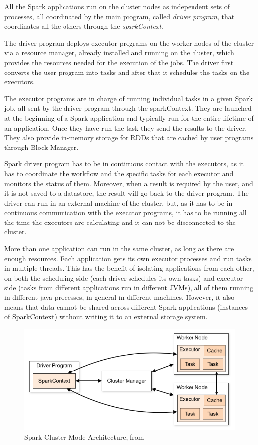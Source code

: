 \documentclass[11pt]{book} %
\begin{document}
      All the Spark applications run on the cluster nodes as independent sets of processes, all coordinated by the main program, called \emph{driver program}, that coordinates all the others through the \emph{sparkContext}.

      The driver program deploys executor programs on the worker nodes of the cluster via a resource manager, already installed and running on the cluster, which provides the resources needed for the execution of the jobs. The driver first converts the user program into tasks and after that it schedules the tasks on the executors.

      The executor programs are in charge of running individual tasks in a given Spark job, all sent by the driver program through the sparkContext. They are launched at the beginning of a Spark application and typically run for the entire lifetime of an application. Once they have run the task they send the results to the driver. They also provide in-memory storage for RDDs that are cached by user programs through Block Manager.

      Spark driver program has to be in continuous contact with the executors, as it has to coordinate the workflow and the specific tasks for each executor and monitors the status of them. Moreover, when a result is required by the user, and it is not saved to a datastore, the result will go back to the driver program. The driver can run in an external machine of the cluster, but, as it has to be in continuous communication with the executor programs, it has to be running all the time the executors are calculating and it can not be disconnected to the cluster.

      More than one application can run in the same cluster, as long as there are enough resources. Each application gets its own executor processes and run tasks in multiple threads. This has the benefit of isolating applications from each other, on both the scheduling side (each driver schedules its own tasks) and executor side (tasks from different applications run in different JVMs), all of them running in different java processes, in general in different machines. However, it also means that data cannot be shared across different Spark applications (instances of SparkContext) without writing it to an external storage system.

      \begin{figure}[!ht]
        \centering
        \includegraphics[width=\textwidth]{cluster-overview.png}
        \caption{Spark Cluster Mode Architecture, from \cite{spark_documentation}}
        \label{img:spark_architecture}
      \end{figure}
\end{document}
